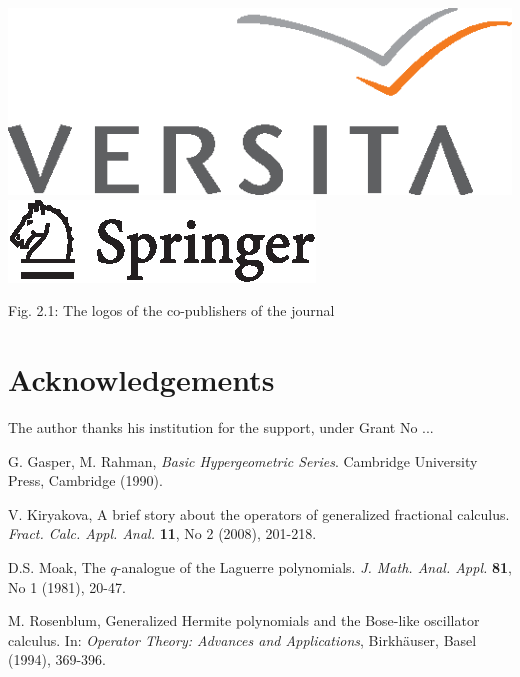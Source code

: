 \documentclass[twoside,reqno,11pt]{fcaa}
\begin{document}
 \begin{center}
 \includegraphics[scale=0.4]{versita.eps}
 \hspace*{2cm}
 \includegraphics[scale=0.7]{springer.eps}

 \bigskip

Fig. 2.1: The logos of the co-publishers of the journal
 \end{center}

\smallskip
\section*{Acknowledgements}

The author thanks his institution for the support, under Grant No
...


 \begin{thebibliography}{99}
 \normalsize

 G. Gasper, M. Rahman,
 {\it Basic Hypergeometric Series}.
 Cambridge University Press, Cambridge (1990).

 V. Kiryakova,
 A brief story about the operators of generalized
fractional calculus.
 \emph{Fract. Calc. Appl. Anal.} \textbf{11}, No 2 (2008), 201-218.

 D.S. Moak,
 The $q$-analogue of the Laguerre polynomials.
{\it J. Math. Anal. Appl.} {\bf 81}, No 1 (1981), 20-47.

 M. Rosenblum,
 Generalized Hermite polynomials and the Bose-like oscillator
 calculus.
 In: {\it Operator Theory: Advances and Applications},
 Birkh\"auser, Basel (1994), 369-396.

\end{thebibliography} %
\end{document}
